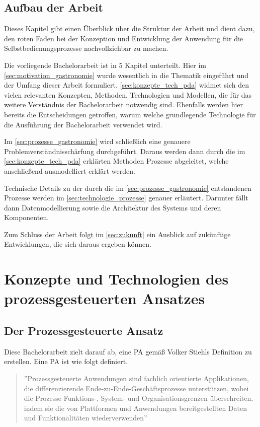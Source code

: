 \subsection{Aufbau der Arbeit}
Dieses Kapitel gibt einen Überblick über die Struktur der Arbeit und dient dazu, den roten Faden bei der Konzeption und Entwicklung der Anwendung für die Selbstbedienungsprozesse nachvollziehbar zu machen.

Die vorliegende Bachelorarbeit ist in 5 Kapitel unterteilt. Hier im \autoref{sec:motivation_gastronomie} wurde wesentlich in die Thematik eingeführt und der Umfang dieser Arbeit formuliert. \autoref{sec:konzepte_tech_pda} widmet sich den vielen relevanten Konzepten, Methoden, Technologien und Modellen, die für das weitere Verständnis der Bachelorarbeit notwendig sind. Ebenfalls werden hier bereits die Entscheidungen getroffen, warum welche grundlegende Technologie für die Ausführung der Bachelorarbeit verwendet wird.

Im \autoref{sec:prozesse_gastronomie} wird schließlich eine genauere Problemverständnisschärfung durchgeführt. Daraus werden dann durch die im  \autoref{sec:konzepte_tech_pda} erklärten Methoden Prozesse abgeleitet, welche anschließend ausmodelliert erklärt werden.

Technische Details zu der durch die im \autoref{sec:prozesse_gastronomie} entstandenen Prozesse werden im \autoref{sec:technologie_prozesse} genauer erläutert. Darunter fällt dann Datenmodellierung sowie die Architektur des Systems und deren Komponenten.

Zum Schluss der Arbeit folgt im \autoref{sec:zukunft} ein Ausblick auf zukünftige Entwicklungen, die sich daraus ergeben können.

\clearpage
\section{Konzepte und Technologien des prozessgesteuerten Ansatzes}
\label{sec:konzepte_tech_pda}
\subsection{Der Prozessgesteuerte Ansatz}
Diese Bachelorarbeit zielt darauf ab, eine \ac{PA} gemäß Volker Stiehls Definition zu erstellen. Eine \ac{PA} ist wie folgt definiert.

\begin{quote}
''Prozessgesteuerte Anwendungen sind fachlich orientierte Applikationen, die differenzierende Ende-zu-Ende-Geschäftsprozesse unterstützen, wobei die Prozesse Funktions-, System- und Organisationsgrenzen überschreiten, indem sie die von Plattformen und Anwendungen bereitgestellten Daten und Funktionalitäten wiederverwenden'' \citep[][S. 24]{stiehl_prozessgesteuerte_2013}
\end{quote}


